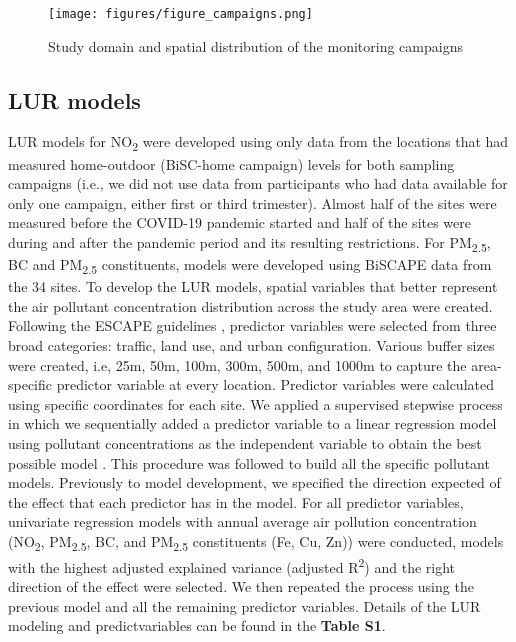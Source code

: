 \documentclass{article}
\begin{document}
\captionsetup[figure]{skip=0pt}
\begin{figure}[!htb]
\texttt{[image: figures/figure\_campaigns.png]}
\caption{Study domain and spatial distribution of the monitoring campaigns}
\label{fig1}
\end{figure}

\subsection{LUR models}

LUR models for NO\textsubscript{2} were developed using only data from the locations that had measured home-outdoor (BiSC-home campaign) levels for both sampling campaigns (i.e., we did not use data from participants who had data available for only one campaign, either first or third trimester). Almost half of the sites were measured before the COVID-19 pandemic started and half of the sites were during and after the pandemic period and its resulting restrictions. For PM\textsubscript{2.5}, BC  and PM\textsubscript{2.5} constituents, models were developed using BiSCAPE data from the 34 sites. To develop the LUR models, spatial variables that better represent the air pollutant concentration distribution across the study area were created. Following the ESCAPE guidelines \cite{ESCAPE2010, eeftens2012, beelen2013},  predictor variables were selected from three broad categories: traffic, land use, and urban configuration. Various buffer sizes were created, i.e, 25m, 50m, 100m, 300m, 500m, and 1000m to capture the area-specific predictor variable at every location. Predictor variables were calculated using specific coordinates for each site. We applied a supervised stepwise process in which we sequentially added a predictor variable to a linear regression model using pollutant concentrations as the independent variable to obtain the best possible model \cite{eeftens2012, beelen2013}. This procedure was followed to build all the specific pollutant models. Previously to model development, we specified the direction expected of the effect that each predictor has in the model. For all predictor variables, univariate regression models with annual average air pollution concentration (NO\textsubscript{2}, PM\textsubscript{2.5}, BC, and PM\textsubscript{2.5} constituents (Fe, Cu, Zn)) were conducted, models with the highest adjusted explained variance (adjusted R\textsuperscript{2}) and the right direction of the effect were selected. We then repeated the process using the previous model and all the remaining predictor variables. Details of the LUR modeling and predictvariables can be found in the \textbf{Table S1}.
\end{document}

